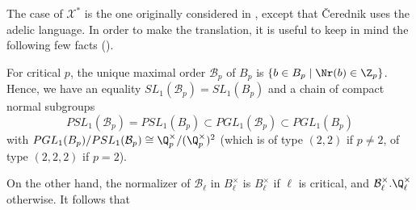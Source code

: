 \begin{para}\label{para:7.4.4}
 The case of $\mathcal{X}^{\ast}$ is the one originally considered in 
 \cite{uoacbdsopwcq}, except that \v{C}erednik uses the
 adelic language. In order to make the translation, it is useful to keep
 in mind the following few facts (\cf \cite[pp. 40, 99 and passim]{adadq}).


 For critical $p$, the unique maximal order
 $\mathcal{B}_p$ of $B_p$ is $\{b\in B_p \mid \Nr(b)\in
 \Z_p\}$. Hence, we have an equality $SL_1(\mathcal{B}_p) = SL_1(B_p)$
 and a chain of compact normal subgroups
 \begin{equation*}
  PSL_1(\mathcal{B}_p) = PSL_1(B_p)\subset PGL_1(\mathcal{B}_p) \subset
   PGL_1(B_p)
 \end{equation*}
 with $PGL_1(B_p)/PSL_1(\mathcal{B}_p)\cong \Q_p^\times/(\Q_p^\times)^2$
 (which is of type $(2,2)$ if $p\neq 2$, of type $(2,2,2)$ if $p=2$). 

 On the other hand, the normalizer of $\mathcal{B}_\ell$ in
 $B_{\ell}^{\times}$ is $B_{\ell}^{\times}$ if $\ell$ is critical, and
 $\mathcal{B}_\ell^\times.\Q_{\ell}^{\times}$ otherwise. It follows that  


\end{para}
